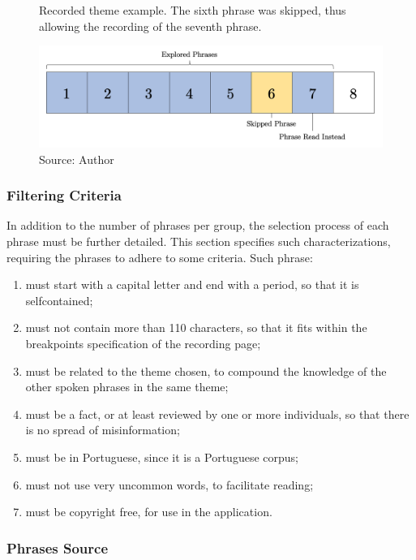 \begin{figure}[h]
    \centering
    \caption{Recorded theme example. The sixth phrase was skipped, thus allowing the recording of the seventh phrase.}
    \includegraphics[width=\linewidth]{images/sw-req-spec/phrase-skip.png}
    \caption*{Source: Author}
    \label{fig:falealgumacoisa-phrase-skip}
\end{figure}

\subsubsection{Filtering Criteria}

In addition to the number of phrases per group, the selection process of each phrase must be further detailed. This section specifies such characterizations, requiring the phrases to adhere to some criteria. Such phrase:

\begin{enumerate}
    \item must start with a capital letter and end with a period, so that it is selfcontained;
    \item must not contain more than 110 characters, so that it fits within the breakpoints specification of the recording page;
    \item must be related to the theme chosen, to compound the knowledge of the other spoken phrases in the same theme;
    \item must be a fact, or at least reviewed by one or more individuals, so that there is no spread of misinformation;
    \item must be in Portuguese, since it is a Portuguese corpus;
    \item must not use very uncommon words, to facilitate reading;
    \item must be copyright free, for use in the application.
\end{enumerate}

\subsubsection{Phrases Source}


